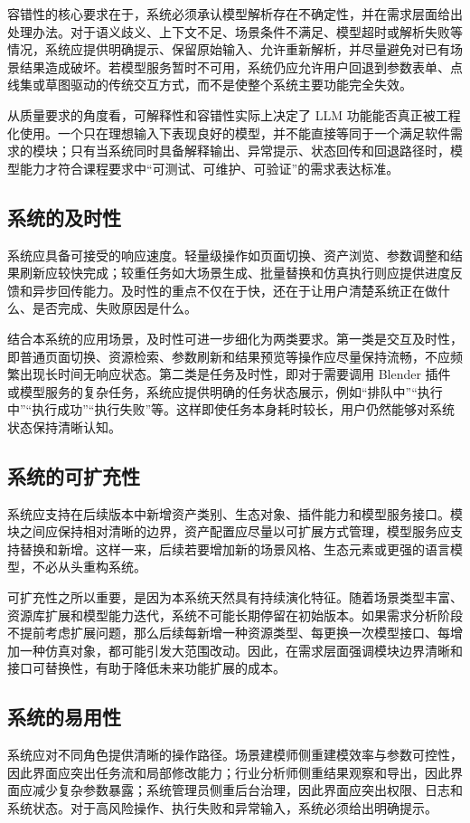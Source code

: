 \documentclass[UTF8,a4paper,10pt]{ctexart}
\begin{document}
容错性的核心要求在于，系统必须承认模型解析存在不确定性，并在需求层面给出处理办法。对于语义歧义、上下文不足、场景条件不满足、模型超时或解析失败等情况，系统应提供明确提示、保留原始输入、允许重新解析，并尽量避免对已有场景结果造成破坏。若模型服务暂时不可用，系统仍应允许用户回退到参数表单、点线集或草图驱动的传统交互方式，而不是使整个系统主要功能完全失效。

从质量要求的角度看，可解释性和容错性实际上决定了 LLM 功能能否真正被工程化使用。一个只在理想输入下表现良好的模型，并不能直接等同于一个满足软件需求的模块；只有当系统同时具备解释输出、异常提示、状态回传和回退路径时，模型能力才符合课程要求中“可测试、可维护、可验证”的需求表达标准。

\subsection{系统的及时性}
系统应具备可接受的响应速度。轻量级操作如页面切换、资产浏览、参数调整和结果刷新应较快完成；较重任务如大场景生成、批量替换和仿真执行则应提供进度反馈和异步回传能力。及时性的重点不仅在于快，还在于让用户清楚系统正在做什么、是否完成、失败原因是什么。

结合本系统的应用场景，及时性可进一步细化为两类要求。第一类是交互及时性，即普通页面切换、资源检索、参数刷新和结果预览等操作应尽量保持流畅，不应频繁出现长时间无响应状态。第二类是任务及时性，即对于需要调用 Blender 插件或模型服务的复杂任务，系统应提供明确的任务状态展示，例如“排队中”“执行中”“执行成功”“执行失败”等。这样即使任务本身耗时较长，用户仍然能够对系统状态保持清晰认知。

\subsection{系统的可扩充性}
系统应支持在后续版本中新增资产类别、生态对象、插件能力和模型服务接口。模块之间应保持相对清晰的边界，资产配置应尽量以可扩展方式管理，模型服务应支持替换和新增。这样一来，后续若要增加新的场景风格、生态元素或更强的语言模型，不必从头重构系统。

可扩充性之所以重要，是因为本系统天然具有持续演化特征。随着场景类型丰富、资源库扩展和模型能力迭代，系统不可能长期停留在初始版本。如果需求分析阶段不提前考虑扩展问题，那么后续每新增一种资源类型、每更换一次模型接口、每增加一种仿真对象，都可能引发大范围改动。因此，在需求层面强调模块边界清晰和接口可替换性，有助于降低未来功能扩展的成本。

\subsection{系统的易用性}
系统应对不同角色提供清晰的操作路径。场景建模师侧重建模效率与参数可控性，因此界面应突出任务流和局部修改能力；行业分析师侧重结果观察和导出，因此界面应减少复杂参数暴露；系统管理员侧重后台治理，因此界面应突出权限、日志和系统状态。对于高风险操作、执行失败和异常输入，系统必须给出明确提示。
\end{document}
